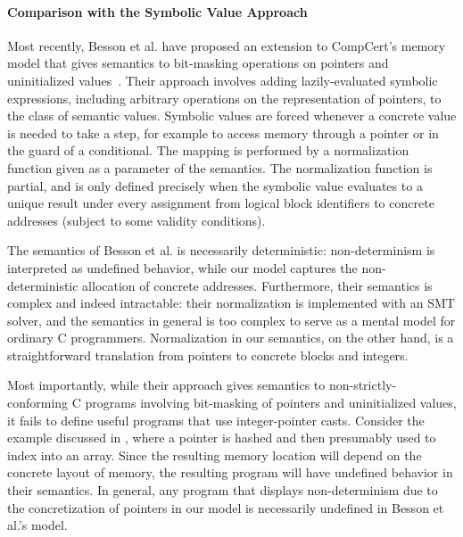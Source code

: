 \paragraph{Comparison with the Symbolic Value Approach}
Most recently, Besson et al. have proposed an extension to CompCert's
memory model that gives semantics to bit-masking operations on
pointers and uninitialized values~\cite{besson2014precise}. Their
approach involves adding lazily-evaluated symbolic expressions,
including arbitrary operations on the representation of pointers, to
the class of semantic values. Symbolic values are forced whenever a
concrete value is needed to take a step, for example to access memory
through a pointer or in the guard of a conditional. The mapping is
performed by a normalization function given as a parameter of the
semantics. The normalization function is partial, and is only defined
precisely when the symbolic value evaluates to a unique result under
every assignment from logical block identifiers to concrete addresses
(subject to some validity conditions).

The semantics of Besson et al. is necessarily deterministic: non-determinism is
interpreted as undefined behavior, while our model
captures the non-deterministic allocation of concrete addresses.
Furthermore, their semantics is complex and indeed intractable: their
normalization is implemented with an SMT solver, and the semantics in general is too complex to serve as a mental model for ordinary C programmers. Normalization in our semantics,
on the other hand, is a straightforward translation from
pointers to concrete blocks and integers.

Most importantly, while their approach gives semantics to non-strictly-conforming C programs
involving bit-masking of pointers and uninitialized values, it fails to define useful programs that
use integer-pointer casts.  Consider the  example discussed in
, where a pointer is hashed and then presumably used
to index into an array.  Since the resulting memory location will depend on the concrete layout of
memory, the resulting program will have undefined behavior in their semantics.  In general, any
program that displays non-determinism due to the concretization of pointers in our model is necessarily
undefined in Besson et al.'s model.



